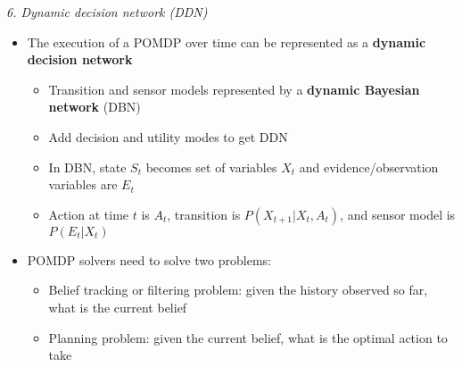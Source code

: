\documentclass[12pt]{article}
\begin{document}
\noindent
\textsl{6. Dynamic decision network (DDN)}
\begin{itemize}
\item The execution of a POMDP over time can be represented as a \textbf{dynamic decision network}
\begin{itemize}
\item Transition and sensor models represented by a \textbf{dynamic Bayesian network} (DBN)
\item Add decision and utility modes to get DDN
\item In DBN, state $S_t$ becomes set of variables $X_t$ and evidence/observation variables are $E_t$
\item Action at time $t$ is $A_t$, transition is $P(X_{t+1} | X_t, A_t)$, and sensor model is $P(E_t | X_t)$ 
\end{itemize}
\item POMDP solvers need to solve two problems:
\begin{itemize}
\item Belief tracking or filtering problem: given the history observed so far, what is the current belief
\item Planning problem: given the current belief, what is the optimal action to take
\end{itemize}

\end{itemize}
\end{document}
